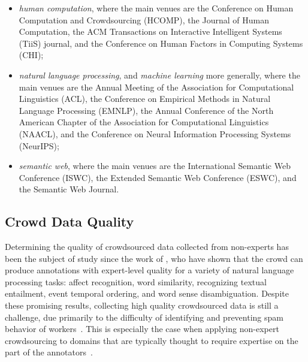\begin{itemize}
    \item \textit{human computation}, where the main venues are the Conference on Human Computation and Crowdsourcing (HCOMP), the Journal of Human Computation, the ACM Transactions on Interactive Intelligent Systems (TiiS) journal, and the Conference on Human Factors in Computing Systems (CHI);
    
    \item \textit{natural language processing}, and \textit{machine learning} more generally, where the main venues are the Annual Meeting of the Association for Computational Linguistics (ACL), the Conference on Empirical Methods in Natural Language Processing (EMNLP), the Annual Conference of the North American Chapter of the Association for Computational Linguistics (NAACL), and the Conference on Neural Information Processing Systems (NeurIPS);
    
    \item \textit{semantic web}, where the main venues are the International Semantic Web Conference (ISWC), the Extended Semantic Web Conference (ESWC), and the Semantic Web Journal.
\end{itemize}


\subsection{Crowd Data Quality}

Determining the quality of crowdsourced data collected from non-experts has been the subject of study since the work of \citet{Snow:2008}, who have shown that the crowd can produce annotations with expert-level quality for a variety of natural language processing tasks: affect  recognition, word similarity, recognizing textual entailment, event temporal ordering, and word sense disambiguation. Despite these promising results, collecting high quality crowdsourced data is still a challenge, due primarily to the difficulty of identifying and preventing spam behavior of workers~\cite{difallah2012mechanical,demartini2012zencrowd}. This is especially the case when applying non-expert crowdsourcing to domains that are typically thought to require expertise on the part of the annotators~\cite{callison2010creating}.

